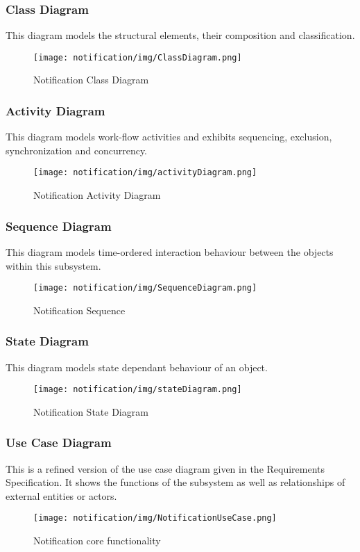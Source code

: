 \subsubsection{Class Diagram}
This diagram models the structural elements, their composition and classification.

\begin{figure}[H]
	\centering
	\texttt{[image: notification/img/ClassDiagram.png]}
	\caption{Notification Class Diagram}
\end{figure}

\newpage
\subsubsection{Activity Diagram}
This diagram models work-flow activities and exhibits sequencing, exclusion, synchronization and concurrency.
\begin{figure}[H]
	\centering
	\texttt{[image: notification/img/activityDiagram.png]}
	\caption{Notification Activity Diagram}
\end{figure}


\subsubsection{Sequence Diagram}
This diagram models time-ordered interaction behaviour between the objects within this subsystem.
\begin{figure}[H]
	\centering
	\texttt{[image: notification/img/SequenceDiagram.png]}
	\caption{Notification Sequence}
\end{figure}

\newpage
\subsubsection{State Diagram}
This diagram models state dependant behaviour of an object.
\begin{figure}[H]
	\centering
	\texttt{[image: notification/img/stateDiagram.png]}
	\caption{Notification State Diagram}
\end{figure}




\subsubsection{Use Case Diagram}
This is a refined version of the use case diagram given in the Requirements Specification. It shows the functions of the subsystem as well as relationships of external entities or actors.
\begin{figure}[H]
	\centering
	\texttt{[image: notification/img/NotificationUseCase.png]}
	\caption{Notification core functionality }
\end{figure}
